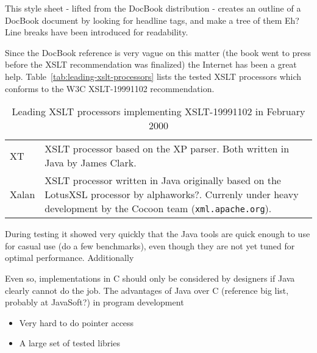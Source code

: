 This style sheet - lifted from the DocBook distribution - creates an
outline of a DocBook document by looking for headline tags, and make a
tree of them \textsf{Eh? }  Line breaks have been introduced for
readability.

{\small

}






Since the DocBook reference is very vague on this matter (the book
went to press before the XSLT recommendation was finalized) the
Internet has been a great help.
Table~\vref{tab:leading-xslt-processors} lists the tested XSLT
processors which conforms to the W3C XSLT-19991102 recommendation.  


\begin{table}[htbp]
  \begin{center}
    \begin{tabular}{|l|p{10cm}|}

      \hline\hline
      
      XT &  XSLT processor based on the XP parser.  Both
      written in Java\textsf{ by James Clark}. \\

      Xalan & XSLT processor written in Java originally based on the
      LotusXSL processor by \textsf{alphaworks?}.   Currenly under
      heavy development by the Cocoon team 
      (\texttt{xml.apache.org}). \\
      
      \hline
    \end{tabular}
    \caption{Leading XSLT processors implementing
      \textsf{XSLT-19991102} in February 2000} 
    \label{tab:leading-xslt-processors}
  \end{center}
\end{table}

During testing it showed very quickly that the Java tools are quick
enough to use for casual use (\textsf{do a few benchmarks}), even
though they are not yet tuned for optimal performance.  Additionally


Even so, implementations in C
should only be considered by designers if Java clearly cannot do the
job.  The advantages of Java over C (\textsf{reference big list,
  probably at JavaSoft?}) in program development

\begin{itemize}
\item Very hard to do pointer access
\item A large set of tested libries
\end{itemize}

